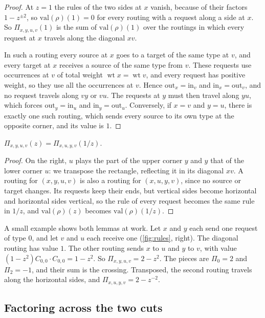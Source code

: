 \documentclass[11pt]{article}
\theoremstyle{definition}
\theoremstyle{definition}
\theoremstyle{remark}
\newcommand{\wt}{\operatorname{wt}}
\newcommand{\out}{\mathrm{out}}
\newcommand{\inn}{\mathrm{in}}
\begin{document}
\begin{proof}
At $z=1$ the rules of the two sides at $x$ vanish, because of their factors $1-z^{\pm2}$, so $\mathrm{val}(\rho)(1)=0$ for every routing with a request along a side at $x$. So $\Pi_{x,y,u,v}(1)$ is the sum of $\mathrm{val}(\rho)(1)$ over the routings in which every request at $x$ travels along the diagonal $xv$.

In such a routing every source at $x$ goes to a target of the same type at $v$, and every target at $x$ receives a source of the same type from $v$. These requests use occurrences at $v$ of total weight $\wt x=\wt v$, and every request has positive weight, so they use all the occurrences at $v$. Hence $\out_x=\inn_v$ and $\inn_x=\out_v$, and no request travels along $vy$ or $vu$. The requests at $y$ must then travel along $yu$, which forces $\out_y=\inn_u$ and $\inn_y=\out_u$. Conversely, if $x=v$ and $y=u$, there is exactly one such routing, which sends every source to its own type at the opposite corner, and its value is $1$.
\end{proof}

\begin{lemma}\label{lem:symmetry}
$\Pi_{x,y,u,v}(z)=\Pi_{x,u,y,v}(1/z)$.
\end{lemma}

\begin{proof}
On the right, $u$ plays the part of the upper corner $y$ and $y$ that of the lower corner $u$: we transpose the rectangle, reflecting it in its diagonal $xv$. A routing for $(x,y,u,v)$ is also a routing for $(x,u,y,v)$, since no source or target changes. Its requests keep their ends, but vertical sides become horizontal and horizontal sides vertical, so the rule of every request becomes the same rule in $1/z$, and $\mathrm{val}(\rho)(z)$ becomes $\mathrm{val}(\rho)(1/z)$.
\end{proof}

A small example shows both lemmas at work. Let $x$ and $y$ each send one request of type $0$, and let $v$ and $u$ each receive one (\cref{fig:rules}, right). The diagonal routing has value $1$. The other routing sends $x$ to $u$ and $y$ to $v$, with value $(1-z^2)C_{0,0}\cdot C_{0,0}=1-z^2$. So $\Pi_{x,y,u,v}=2-z^2$. The pieces are $\Pi_0=2$ and $\Pi_2=-1$, and their sum is the crossing. Transposed, the second routing travels along the horizontal sides, and $\Pi_{x,u,y,v}=2-z^{-2}$.

\subsection{Factoring across the two cuts}
\end{document}
